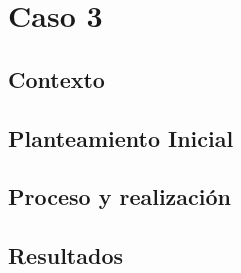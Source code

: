  \section{Caso 3}

\subsection{Contexto}
\subsection{Planteamiento Inicial}
\subsection{Proceso y realización}
\subsection{Resultados}
